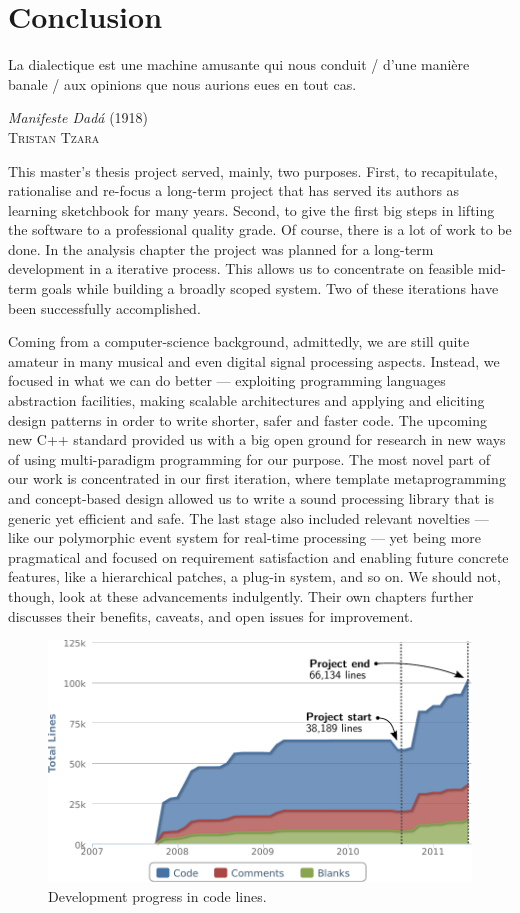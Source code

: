 \chapter{Conclusion}
\label{sec:05-conclusion}

\epigraph{La dialectique est une machine amusante qui nous conduit /
  d'une manière banale / aux opinions que nous aurions eues en tout
  cas.}{\emph{Manifeste Dadá} (1918)\\\textsc{Tristan Tzara}}

This master's thesis project served, mainly, two purposes. First, to
recapitulate, rationalise and re-focus a long-term project that has
served its authors as learning sketchbook for many years. Second, to
give the first big steps in lifting the software to a professional
quality grade. Of course, there is a lot of work to be done. In the
analysis chapter the project was planned for a long-term development
in a iterative process. This allows us to concentrate on feasible
mid-term goals while building a broadly scoped system. Two of these
iterations have been successfully accomplished. 

Coming from a computer-science background, admittedly, we are still
quite amateur in many musical and even digital signal processing
aspects. Instead, we focused in what we can do better --- exploiting
programming languages abstraction facilities, making scalable
architectures and applying and eliciting design patterns in order to
write shorter, safer and faster code. The upcoming new C++ standard
provided us with a big open ground for research in new ways of using
multi-paradigm programming for our purpose. The most novel part of our
work is concentrated in our first iteration, where template
metaprogramming and concept-based design allowed us to write a sound
processing library that is generic yet efficient and safe. The last
stage also included relevant novelties --- like our polymorphic event
system for real-time processing --- yet being more pragmatical and
focused on requirement satisfaction and enabling future concrete
features, like a hierarchical patches, a plug-in system, and so on. We
should not, though, look at these advancements indulgently. Their own
chapters further discusses their benefits, caveats, and open issues
for improvement.

\begin{figure}[h!]
  \centering
  \includegraphics[width=\textwidth]{pic/dev-progress.pdf}
  \caption{Development progress in code lines.}
  \label{fig:dev-progress}
\end{figure}

